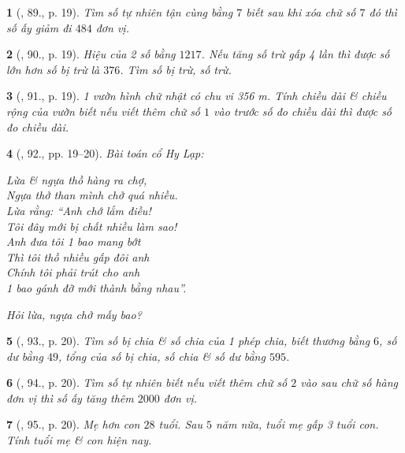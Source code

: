 \documentclass{article}
\newtheorem{baitoan}{}
\begin{document}
\begin{baitoan}[\cite{Binh_Toan_6_tap_1}, 89., p. 19]
	Tìm số tự nhiên tận cùng bằng $7$ biết sau khi xóa chữ số $7$ đó thì số ấy giảm đi $484$ đơn vị.
\end{baitoan}

\begin{baitoan}[\cite{Binh_Toan_6_tap_1}, 90., p. 19]
	Hiệu của 2 số bằng $1217$. Nếu tăng số trừ gấp 4 lần thì được số lớn hơn số bị trừ là $376$. Tìm số bị trừ, số trừ.
\end{baitoan}

\begin{baitoan}[\cite{Binh_Toan_6_tap_1}, 91., p. 19]
	1 vườn hình chữ nhật có chu vi {\rm356 m}. Tính chiều dài \& chiều rộng của vườn biết nếu viết thêm chữ số $1$ vào trước số đo chiều dài thì được số đo chiều dài.
\end{baitoan}

\begin{baitoan}[\cite{Binh_Toan_6_tap_1}, 92., pp. 19--20]
	Bài toán cổ Hy Lạp:
	\begin{center}
		Lừa \& ngựa thồ hàng ra chợ,\\Ngựa thở than mình chở quá nhiều.\\Lừa rằng: ``Anh chớ lắm điều!\\Tôi đây mới bị chất nhiều làm sao!\\Anh đưa tôi 1 bao mang bớt\\Thì tôi thồ nhiều gấp đôi anh\\Chính tôi phải trút cho anh\\1 bao gánh đỡ mới thành bằng nhau''.
	\end{center}
	Hỏi lừa, ngựa chở mấy bao?
\end{baitoan}

\begin{baitoan}[\cite{Binh_Toan_6_tap_1}, 93., p. 20]
	Tìm số bị chia \& số chia của 1 phép chia, biết thương bằng $6$, số dư bằng $49$, tổng của số bị chia, số chia \& số dư bằng $595$.
\end{baitoan}

\begin{baitoan}[\cite{Binh_Toan_6_tap_1}, 94., p. 20]
	Tìm số tự nhiên biết nếu viết thêm chữ số $2$ vào sau chữ số hàng đơn vị thì số ấy tăng thêm $2000$ đơn vị.
\end{baitoan}

\begin{baitoan}[\cite{Binh_Toan_6_tap_1}, 95., p. 20]
	Mẹ hơn con $28$ tuổi. Sau $5$ năm nữa, tuổi mẹ gấp 3 tuổi con. Tính tuổi mẹ \& con hiện nay.
\end{baitoan}
\end{document}
